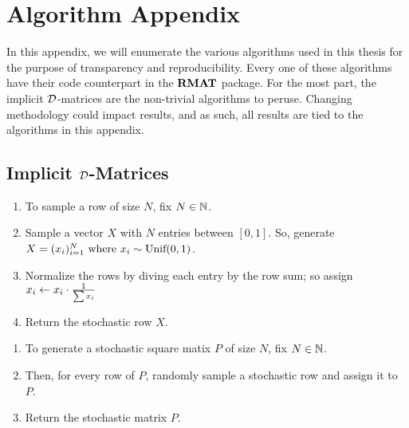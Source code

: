 
\chapter{Algorithm Appendix}

In this appendix, we will enumerate the various algorithms used in this thesis for the purpose of transparency and reproducibility. Every one of these algorithms have their code counterpart in the ${\textbf{RMAT}}$ package. For the most part, the implicit $\mathcal{D}$-matrices are the non-trivial algorithms to peruse. Changing methodology could impact results, and as such, all results are tied to the algorithms in this appendix.

\section{Implicit $\mathcal{D}$-Matrices}

\begin{algorithm} \hfill
\begin{enumerate}
	\item To sample a row of size $N$, fix $N \in \mathbb{N}$.
	\item Sample a vector $X$ with $N$ entries between $[0,1]$. So, generate $X = (x_i)_{i = 1}^N \text{ where } x_i \sim \text{Unif}(0,1)$.
	\item Normalize the rows by diving each entry by the row sum; so assign $x_i \leftarrow x_i \cdot \frac{1}{\sum{x_i}}$
	\item Return the stochastic row $X$.
\end{enumerate}
\end{algorithm}

\begin{algorithm} \hfill
\begin{enumerate}
	\item To generate a stochastic square matix $P$ of size $N$, fix $N \in \mathbb{N}$.
	\item Then, for every row of $P$, randomly sample a stochastic row and assign it to $P$.
	\item Return the stochastic matrix $P$.
\end{enumerate}
\end{algorithm}

